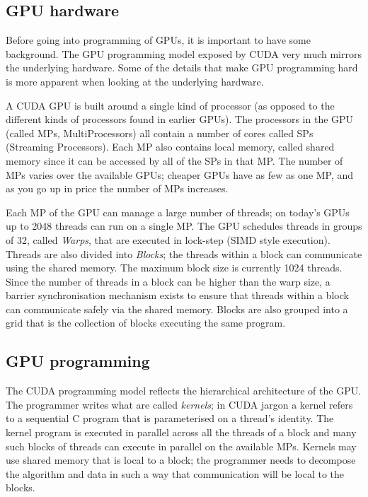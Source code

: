 \documentclass[a4paper]{book}
\begin{document}
\subsection{GPU hardware} 

Before going into programming of GPUs, it is important to have some background. The 
GPU programming model exposed by CUDA very much mirrors the underlying hardware. Some 
of the details that make GPU programming hard is more apparent when looking at the 
underlying hardware. 

A CUDA GPU is built around a single kind of processor (as opposed to the different 
kinds of processors found in earlier GPUs). The processors in the GPU (called MPs, 
MultiProcessors) all contain a number of cores called SPs (Streaming Processors). 
Each MP also contains local memory, called shared memory since it can be accessed 
by all of the SPs in that MP. The number of MPs varies over the available GPUs; cheaper 
GPUs have as few as one MP, and as you go up in price the number of MPs increases.

Each MP of the GPU can manage a large number of threads; on today's GPUs up to 
2048 threads can run on a single MP. The GPU schedules threads in groups of 32, called 
{\em Warps}, that are executed in lock-step (SIMD style execution). Threads are 
also divided into {\em Blocks}; the threads within a block can communicate using the 
shared memory. The maximum block size is currently 1024 threads. Since 
the number of threads in a block can be higher than the warp size, a barrier 
synchronisation mechanism exists to ensure that threads within a block 
can communicate safely via the shared memory. Blocks are also grouped into a grid that 
is the collection of blocks executing the same program. 

\subsection{GPU programming} 

The CUDA programming model reflects the hierarchical architecture of the GPU. The 
programmer writes what are called \emph{kernels}; in CUDA jargon a kernel refers to a sequential 
C program that is parameterised on a thread's identity. The kernel program is executed 
in parallel across all the threads of a block and many such blocks of threads can execute 
in parallel on the available MPs. Kernels may use shared memory that is local to a block; 
the programmer needs to decompose the algorithm and data in such a way that communication 
will be local to the blocks. 
\end{document}

